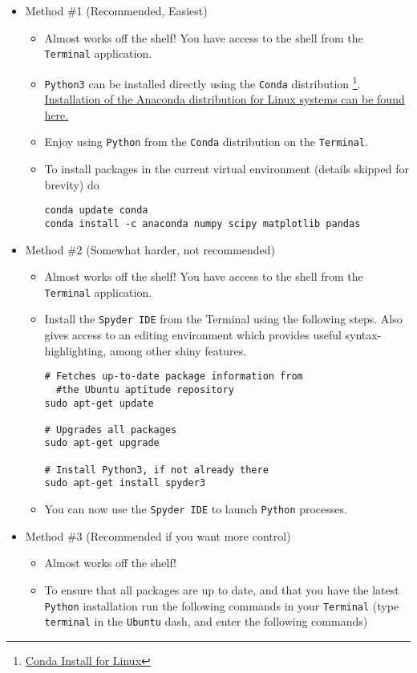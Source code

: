 \documentclass[11pt]{article}
\begin{document}
\begin{itemize}
\item Method \#1 (Recommended, Easiest)
\label{sec:org8e6fe57}
\begin{itemize}
\item Almost works off the shelf! You have access to the shell from the \texttt{Terminal} application.
\item \texttt{Python3} can be installed directly using the \texttt{Conda} distribution \footnote{\href{https://www.anaconda.com/download/\#linux}{Conda Install for Linux}\label{org4a6e3a2}}. \href{https://www.anaconda.com/download/\#linux}{Installation of the Anaconda distribution for Linux systems can be found here.}
\item Enjoy using \texttt{Python} from the \texttt{Conda} distribution on the \texttt{Terminal}.
\item To install packages in the current virtual environment (details skipped for
brevity) do
\begin{verbatim}
conda update conda
conda install -c anaconda numpy scipy matplotlib pandas
\end{verbatim}
\end{itemize}

\item Method \#2 (Somewhat harder, not recommended)
\label{sec:org7c8c091}

\begin{itemize}
\item Almost works off the shelf! You have access to the shell from the \texttt{Terminal} application.
\item Install the \texttt{Spyder IDE} from the Terminal using the following steps. Also
gives access to an editing environment which provides useful
syntax-highlighting, among other shiny features.

\begin{verbatim}
# Fetches up-to-date package information from
  #the Ubuntu aptitude repository
sudo apt-get update

# Upgrades all packages
sudo apt-get upgrade

# Install Python3, if not already there
sudo apt-get install spyder3
\end{verbatim}
\item You can now use the \texttt{Spyder IDE} to launch \texttt{Python} processes.
\end{itemize}

\item Method \#3 (Recommended if you want more control)
\label{sec:org601761b}
\begin{itemize}
\item Almost works off the shelf!
\item To ensure that all packages are up to date, and that you have the latest
\texttt{Python} installation run the following commands in your \texttt{Terminal} (type
\texttt{terminal} in the \texttt{Ubuntu} dash, and enter the following commands)
\end{itemize}


\end{itemize}
\end{document}
